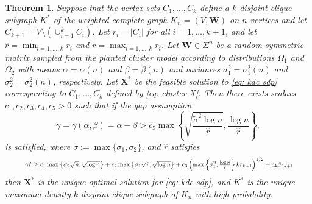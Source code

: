 \documentclass[twoside,11pt]{article}
\newtheorem{theorem}{Theorem}[section]
\newcommand{\bs}{\boldsymbol}
\newcommand{\X}{\bs {X}}
\newcommand{\0}{\bs{0}}
\newcommand{\rbra}[1]{\ensuremath{\left( #1 \right)}} %
\newcommand{\bra}[1]{\ensuremath{\left\{ #1 \right\}}} %
\newcommand{\kdc}{\(k\)-disjoint-clique }
\begin{document}
{\begin{theorem} \label{thm: rec}
	Suppose that the vertex sets \(C_1,\dots,C_k\) define a \(k\)-disjoint-clique subgraph \(K^*\) of the weighted 
	complete graph 
	\(K_n = (V,\bs W)\) on \(n\) vertices and let \(C_{k+1} = V \setminus \left(\cup_{i=1}^k C_i \right)\). Let \(r_i = |C_i|\) for all 
	\(i=1,\dots,k+1\), and let \(\hat{r} = \min_{i=1,\dots,k} r_i\) and \(\tilde{r} = \max_{i=1,\dots,k} r_i\). 
	Let \(\bs{W} \in \Sigma^n\) 
	be a random symmetric matrix sampled from the planted cluster model according to distributions \(\Omega_1\) and 
	\(\Omega_2\) with means \(\alpha = \alpha(n)\) and \(\beta = \beta(n)\) and variances
	\(\sigma_1^2 = \sigma_1^2(n)\) and \(\sigma_2^2 = \sigma_2^2(n)\), respectively. 
	Let \(\X^*\) be the feasible solution to \eqref{eq: kdc sdp} corresponding to \(C_1,\dots,C_k\) defined by 
	\eqref{eq: cluster X}. Then there exists scalars \(c_1, c_2, c_3, c_4, c_5 > 0\) such that if
	the gap assumption
	\begin{equation}
	\label{eq:brendan_27_mod}
		\gamma = \gamma(\alpha,\beta) = \alpha - \beta 
		> c_5 \max \bra{ \sqrt{  \frac{\tilde \sigma^2 \log n }{\hat r} }, 
		\frac{\log n }{\hat r} },
	\end{equation}
		is satisfied, 
		where $\tilde \sigma := \max\{ \sigma_1, \sigma_2\}$,
		and $\hat r$ satisfies
	\begin{equation}\label{eq:smallest_largest}
	\resizebox{0.92\textwidth}{!}{
		\(		
		\gamma \hat r \ge %
		{  c_1 \max\left\lbrace \sigma_2\sqrt{n},  \sqrt{\log n} \right\rbrace 
	+ c_2 \max\left\lbrace \sigma_1\sqrt{ \tilde{r} }, \sqrt{ \log n} \right\rbrace  
			+ c_3 \rbra{ \max \bra{\sigma_1^2, \frac{\log n}{\hat r} } k r_{k+1} }^{1/2} + c_4 \beta r_{k+1} }		\)}		
	\end{equation}
	then \(\bs{X}^*\) is the unique optimal solution for \eqref{eq: kdc sdp}, and \(K^*\) is the unique maximum density \kdc
	subgraph of \(K_n\) with high probability.
\end{theorem}
%

}
\end{document}
